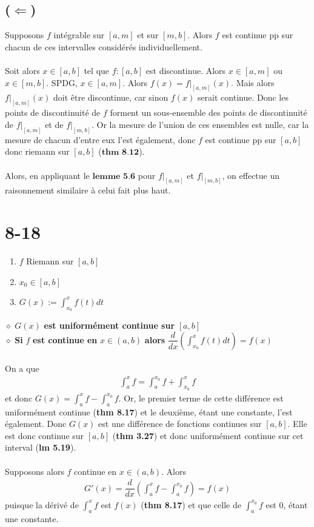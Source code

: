 \documentclass[a4paper,10pt]{article}
\begin{document}
\subsection*{($\Leftarrow$)}
Supposons $f$ intégrable sur $[a,m]$ et sur $[m,b]$. Alors $f$ est continue pp sur chacun de ces intervalles considérés
individuellement.
\\
\\
Soit alors $x \in [a,b]$ tel que $f : [a,b]$ est discontinue. Alors $x \in [a,m]$ ou $x \in [m,b]$. SPDG, $x \in [a,m]$.
Alors $f(x) = f|_{[a,m]}(x)$. Mais alors $f|_{[a,m]}(x)$ doit être discontinue, car sinon $f(x)$ serait continue. Donc 
les points de discontinuité de $f$ forment un sous-ensemble des points de discontinuité de $f|_{[a,m]}$ et de $f|_{[m,b]}$. 
Or la mesure de l'union de ces ensembles est nulle, car la mesure de chacun d'entre eux l'est également,
donc $f$ est continue pp sur $[a,b]$ donc riemann sur $[a,b]$ ($\textbf{thm 8.12}$). 
\\
\\
Alors, en appliquant le $\textbf{lemme 5.6}$ pour $f|_{[a,m]}$ et $f|_{[m,b]}$, on effectue un raisonnement similaire à celui
fait plus haut.

\section*{8-18}
\begin{enumerate}
 \item $f$ Riemann sur $[a,b]$
 \item $x_0 \in [a,b]$
 \item $G(x) := \int_{x_0}^x f(t) dt$
\end{enumerate}
$\diamond$ $G(x)$ \textbf{est uniformément continue sur } $[a,b]$
\\
$\diamond$ \textbf{Si } $f$ \textbf{est continue en} $x \in (a,b)$ \textbf{alors} $\dfrac{d}{dx} \left( \int_{x_0}^x f(t) dt \right) = f(x) $
\\
\\
On a que
\begin{align*}
 \int_a^x f = \int_a^{x_0} f + \int_{x_0}^x f
\end{align*}
et donc $G(x) = \int_a^x f - \int_a^{x_0} f$. Or, le premier terme de cette différence est uniformément continue (\textbf{thm 8.17}) 
et le deuxième, étant une constante, l'est également. Donc $G(x)$ est une différence de fonctions continues sur $[a,b]$. Elle est donc
continue sur $[a,b]$ (\textbf{thm 3.27}) et donc uniformément continue sur cet interval (\textbf{lm 5.19}).
\\
\\
Supposons alors $f$ continue en $x \in (a,b)$. Alors
\begin{align*}
 G'(x) = \dfrac{d}{dx} \left(\int_a^x f - \int_a^{x_0} f \right) = f(x)
\end{align*}
puisque la dérivé de $\int_a^x f$ est $f(x)$ (\textbf{thm 8.17}) et que celle de $\int_a^{x_0} f$ est 0, étant une constante.
\end{document}
